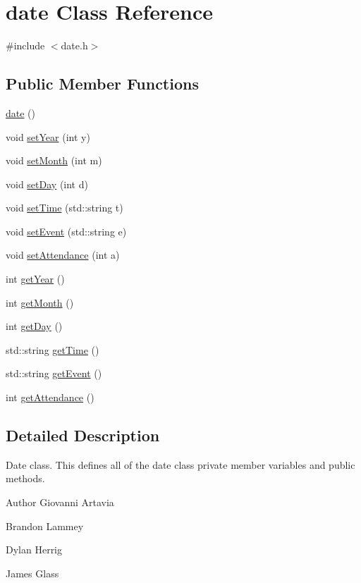 \hypertarget{classdate}{}\section{date Class Reference}
\label{classdate}


{\ttfamily \#include $<$date.\+h$>$}

\subsection*{Public Member Functions}
\begin{DoxyCompactItemize}
\item 
\hyperlink{classdate_ace1e9bd1562330f4d03a385ee0cc2eba}{date} ()
\item 
void \hyperlink{classdate_a390791a3b9cc0c194c6c1111c76fe0cf}{set\+Year} (int y)
\item 
void \hyperlink{classdate_a6e73b5dd43d866eeb88a3de29561679c}{set\+Month} (int m)
\item 
void \hyperlink{classdate_a9806f5cb8229eed570f31043d3cc73f8}{set\+Day} (int d)
\item 
void \hyperlink{classdate_a6775df9799798629ef0c899030885235}{set\+Time} (std\+::string t)
\item 
void \hyperlink{classdate_aa0fe205a0a19cc07929a466ae3be467a}{set\+Event} (std\+::string e)
\item 
void \hyperlink{classdate_a3460b2ab7ad0f4c1d79314d411b01c38}{set\+Attendance} (int a)
\item 
int \hyperlink{classdate_ab99ede8a0f627184cb632c03406f6c89}{get\+Year} ()
\item 
int \hyperlink{classdate_acfb4bfc6dfad0a2d804a2e9ebdd48c1d}{get\+Month} ()
\item 
int \hyperlink{classdate_a59bb03e62bbcd7f4a9cb8505b2d820c9}{get\+Day} ()
\item 
std\+::string \hyperlink{classdate_abc00445f7dad83e1b6bc7c7a27736ef5}{get\+Time} ()
\item 
std\+::string \hyperlink{classdate_ad1ba2d91051725eae822b1dc21f45ff5}{get\+Event} ()
\item 
int \hyperlink{classdate_a2226f7d7e9e6e47d196d450e00fb7478}{get\+Attendance} ()
\end{DoxyCompactItemize}


\subsection{Detailed Description}
Date class. This defines all of the date class\textquotesingle{} private member variables and public methods. \begin{DoxyAuthor}{Author}
Giovanni Artavia 

Brandon Lammey 

Dylan Herrig 

James Glass 
\end{DoxyAuthor}


